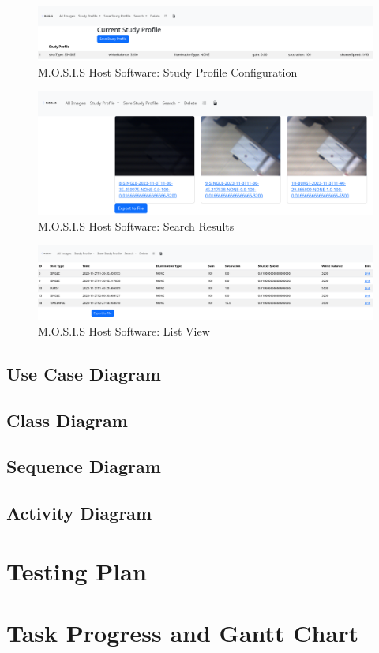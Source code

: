 \documentclass[12pt]{article}
\begin{document}
\begin{figure}[H]
	\includegraphics[width=\textwidth]{Figures/study_profile_save.png}
	\caption{M.O.S.I.S Host Software: Study Profile Configuration}
\end{figure}
\begin{figure}[H]
	\includegraphics[width=\textwidth]{Figures/search_results.png}
	\caption{M.O.S.I.S Host Software: Search Results}
\end{figure}
\begin{figure}[H]
	\includegraphics[width=\textwidth]{Figures/list_view.png}
	\caption{M.O.S.I.S Host Software: List View}
\end{figure}
\subsection{Use Case Diagram}
\subsection{Class Diagram}
\subsection{Sequence Diagram}
\subsection{Activity Diagram}
\section{Testing Plan}
\section{Task Progress and Gantt Chart}
\end{document}
